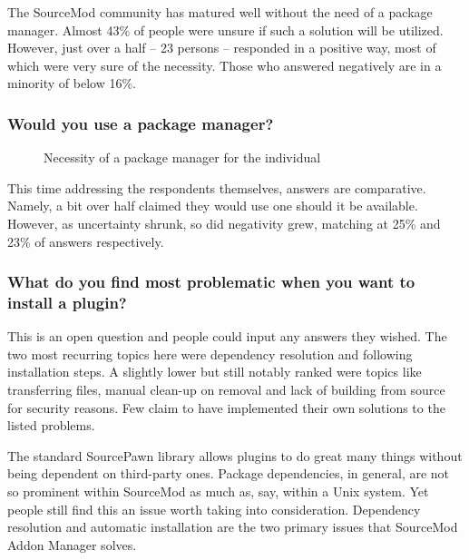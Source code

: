 The SourceMod community has matured well without the need of a package manager.
Almost 43\% of people were unsure if such a solution will be utilized.
However, just over a half -- 23 persons -- responded in a positive way, most of which were very sure of the necessity.
Those who answered negatively are in a minority of below 16\%.

\subsubsection{Would you use a package manager?}

\begin{figure}[H]
  \centering
  \caption{Necessity of a package manager for the individual}
  \label{fig:necessity-of-a-package-manager-for-the-individual}
\end{figure}

This time addressing the respondents themselves, answers are comparative.
Namely, a bit over half claimed they would use one should it be available.
However, as uncertainty shrunk, so did negativity grew, matching at 25\% and 23\% of answers respectively.

\subsubsection{What do you find most problematic when you want to install a plugin?}

This is an open question and people could input any answers they wished.
The two most recurring topics here were dependency resolution and following installation steps.
A slightly lower but still notably ranked were topics like transferring files, manual clean-up on removal and lack of building from source for security reasons.
Few claim to have implemented their own solutions to the listed problems.

The standard SourcePawn library allows plugins to do great many things without being dependent on third-party ones.
Package dependencies, in general, are not so prominent within SourceMod as much as, say, within a Unix system.
Yet people still find this an issue worth taking into consideration.
Dependency resolution and automatic installation are the two primary issues that SourceMod Addon Manager solves.

